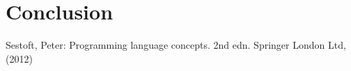 \documentclass[runningheads]{llncs}
\begin{document}
\setcounter{secnumdepth}{-1}
\section{Conclusion}\label{conclusion}


\newpage

%
%

\begin{thebibliography}{8}
Sestoft, Peter: Programming language concepts. 2nd edn. Springer London Ltd,
(2012)



\end{thebibliography}
\end{document}
